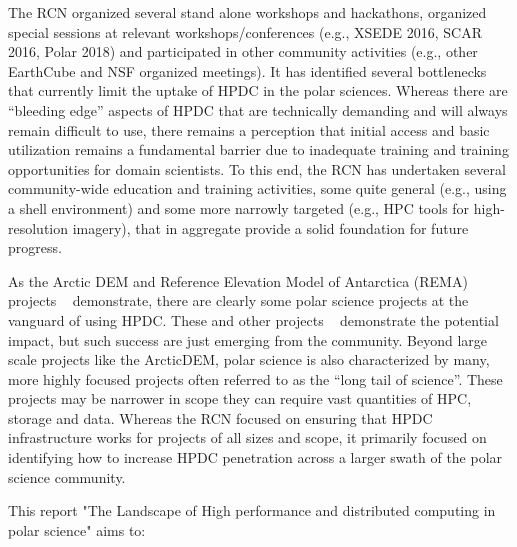 \documentclass[10pt,letterpaper,draft]{article}
\begin{document}
The RCN organized several stand alone workshops and hackathons, organized special sessions at relevant workshops/conferences (e.g., XSEDE 2016, SCAR 2016, Polar 2018) and participated in other community activities (e.g., other EarthCube and NSF organized meetings). It has identified several bottlenecks that currently limit the uptake of HPDC in the polar sciences. Whereas there are “bleeding edge” aspects of HPDC that are technically demanding and will always remain difficult to use, there remains a perception that initial access and basic utilization remains a fundamental barrier due to inadequate training and training opportunities for domain scientists. To this end, the RCN has undertaken several community-wide education and training activities, some quite general (e.g., using a shell environment) and some more narrowly targeted (e.g., HPC tools for high-resolution imagery), that in aggregate provide a solid foundation for future progress.

As the Arctic DEM and Reference Elevation Model of Antarctica (REMA) projects ~\cite{Mimno2016-cw} demonstrate, there are clearly some polar science projects at the vanguard of using HPDC. These and other projects ~\cite{Laws2007-dj} demonstrate the potential impact, but such success are just emerging from the community. Beyond large scale projects like the ArcticDEM, polar science is also characterized by many, more highly focused projects often referred to as the “long tail of science”. These projects may be narrower in scope they can require vast quantities of HPC, storage and data. Whereas the RCN focused on ensuring that HPDC infrastructure works for projects of all sizes and scope, it primarily focused on identifying how to increase HPDC penetration across a larger swath of the polar science community. 

This report "The Landscape of High performance and distributed computing in polar science" aims to:
\end{document}
